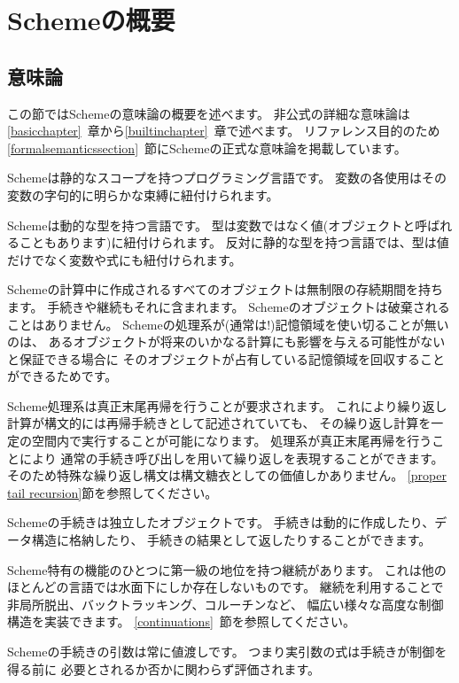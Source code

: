 
\chapter{Schemeの概要}

\section{意味論}
\label{semanticsection}

この節ではSchemeの意味論の概要を述べます。
非公式の詳細な意味論は\ref{basicchapter}~章から\ref{builtinchapter}~章で述べます。
リファレンス目的のため
\ref{formalsemanticssection}~節にSchemeの正式な意味論を掲載しています。

\vest Schemeは静的なスコープを持つプログラミング言語です。
変数の各使用はその変数の字句的に明らかな束縛に紐付けられます。

\vest Schemeは動的な型を持つ言語です。
型は変数ではなく値(オブジェクトと呼ばれることもあります)に紐付けられます。
反対に静的な型を持つ言語では、型は値だけでなく変数や式にも紐付けられます。

\vest Schemeの計算中に作成されるすべてのオブジェクトは無制限の存続期間を持ちます。
手続きや継続もそれに含まれます。
Schemeのオブジェクトは破棄されることはありません。
Schemeの処理系が(通常は!)記憶領域を使い切ることが無いのは、
あるオブジェクトが将来のいかなる計算にも影響を与える可能性がないと保証できる場合に
そのオブジェクトが占有している記憶領域を回収することができるためです。

\vest Scheme処理系は真正末尾再帰を行うことが要求されます。
これにより繰り返し計算が構文的には再帰手続きとして記述されていても、
その繰り返し計算を一定の空間内で実行することが可能になります。
処理系が真正末尾再帰を行うことにより
通常の手続き呼び出しを用いて繰り返しを表現することができます。
そのため特殊な繰り返し構文は構文糖衣としての価値しかありません。
\ref{proper tail recursion}節を参照してください。

\vest Schemeの手続きは独立したオブジェクトです。
手続きは動的に作成したり、データ構造に格納したり、
手続きの結果として返したりすることができます。

\vest Scheme特有の機能のひとつに第一級の地位を持つ継続があります。
これは他のほとんどの言語では水面下にしか存在しないものです。
継続を利用することで非局所脱出、バックトラッキング、コルーチンなど、
幅広い様々な高度な制御構造を実装できます。
\ref{continuations}~節を参照してください。

\vest Schemeの手続きの引数は常に値渡しです。
つまり実引数の式は手続きが制御を得る前に
必要とされるか否かに関わらず評価されます。

